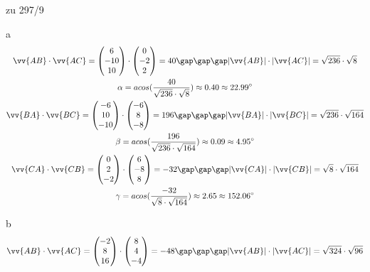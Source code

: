 \begin{exercise}{zu 297/9}
  \item [a]
  \begin{gather*}
    \vv{AB} \cdot \vv{AC} = \begin{pmatrix}6 \\ -10 \\ 10\end{pmatrix} \cdot \begin{pmatrix}0 \\ -2 \\ 2\end{pmatrix} = 40 \gap\gap\gap |\vv{AB}| \cdot |\vv{AC}| = \sqrt{236} \cdot \sqrt{8} \\
    \alpha = acos(\frac{40}{\sqrt{236} \cdot \sqrt{8}}) \approx 0.40 \approx 22.99^\circ \\
    \vv{BA} \cdot \vv{BC} = \begin{pmatrix}-6 \\ 10 \\ -10\end{pmatrix} \cdot \begin{pmatrix}-6 \\ 8 \\ -8\end{pmatrix} = 196 \gap\gap\gap |\vv{BA}| \cdot |\vv{BC}| = \sqrt{236} \cdot \sqrt{164} \\
    \beta = acos(\frac{196}{\sqrt{236} \cdot \sqrt{164}}) \approx 0.09 \approx 4.95^\circ \\
    \vv{CA} \cdot \vv{CB} = \begin{pmatrix}0 \\ 2 \\ -2\end{pmatrix} \cdot \begin{pmatrix}6 \\ -8 \\ 8\end{pmatrix} = -32 \gap\gap\gap |\vv{CA}| \cdot |\vv{CB}| = \sqrt{8} \cdot \sqrt{164} \\
    \gamma = acos(\frac{-32}{\sqrt{8} \cdot \sqrt{164}}) \approx 2.65 \approx 152.06^\circ
  \end{gather*}
  \item [b]
  \begin{gather*}
    \vv{AB} \cdot \vv{AC} = \begin{pmatrix}-2 \\ 8 \\ 16\end{pmatrix} \cdot \begin{pmatrix}8 \\ 4 \\ -4\end{pmatrix} = -48 \gap\gap\gap |\vv{AB}| \cdot |\vv{AC}| = \sqrt{324} \cdot \sqrt{96} \\

\end{gather*}
\end{exercise}
